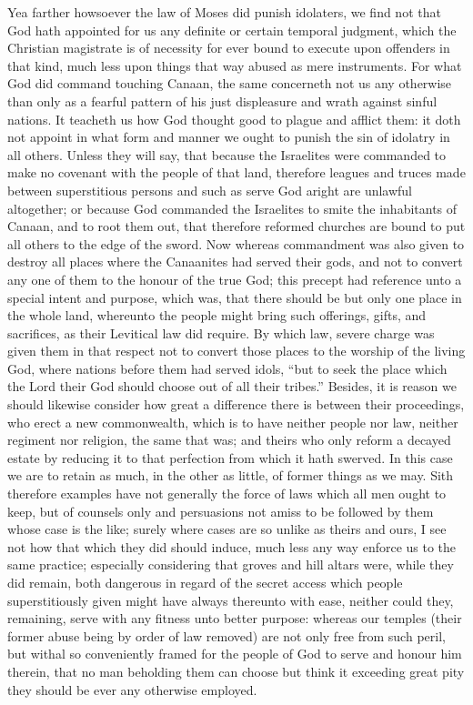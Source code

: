 Yea farther howsoever the law of Moses did punish idolaters, we find not that God hath appointed for us any definite or certain temporal judgment, which the Christian magistrate is of necessity for ever bound to execute upon offenders in that kind, much less upon things that way abused as mere instruments. For what God did command touching Canaan, the same concerneth not us any otherwise than only as a fearful pattern of his just displeasure and wrath against sinful nations. It teacheth us how God thought good to plague and afflict them: it doth not appoint in what form and manner we ought to punish the sin of idolatry in all others. Unless they will say, that because the Israelites were commanded to make no covenant with the people of that land, therefore leagues and truces made between superstitious persons and such as serve God aright are unlawful altogether; or because God commanded the Israelites to smite the inhabitants of Canaan, and to root them out, that therefore  reformed churches are bound to put all others to the edge of the sword.
Now whereas commandment was also given to destroy all places where the Canaanites had served their gods, and not to convert any one of them to the honour of the true God; this precept had reference unto a special intent and purpose, which was, that there should be but only one place in the whole land, whereunto the people might bring such offerings, gifts, and sacrifices, as their Levitical law did require. By which law, severe charge was given them in that respect not to convert those places to the worship of the living God, where nations before them had served idols, “but to seek the place which the Lord their God should choose out of all their tribes.”
Besides, it is reason we should likewise consider how great a difference there is between their proceedings, who erect a new commonwealth, which is to have neither people nor law, neither regiment nor religion, the same that was; and theirs who only reform a decayed estate by reducing it to that perfection from which it hath swerved. In this case we are to retain as much, in the other as little, of former things as we may.
Sith therefore examples have not generally the force of laws which all men ought to keep, but of counsels only and persuasions not amiss to be followed by them whose case is the like; surely where cases are so unlike as theirs and ours, I see not how that which they did should induce, much less any way enforce us to the same practice; especially considering that groves and hill altars were, while they did remain, both dangerous in regard of the secret access which people superstitiously given might have always thereunto with ease, neither could they, remaining, serve with any fitness unto better purpose: whereas our temples (their former abuse being by order of law removed) are not only free from such peril, but withal so conveniently framed for the people of God to serve and honour him therein, that no man beholding them can choose but think it exceeding great pity they should be ever any otherwise employed.
